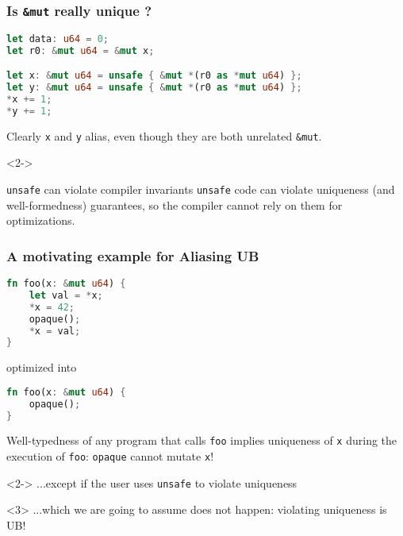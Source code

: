 \begin{frame}[fragile, t]
    \frametitle{Is \texttt{\&mut} really unique ?}
    \begin{lstlisting}[language=rust]
let data: u64 = 0;
let r0: &mut u64 = &mut x;

let x: &mut u64 = unsafe { &mut *(r0 as *mut u64) };
let y: &mut u64 = unsafe { &mut *(r0 as *mut u64) };
*x += 1;
*y += 1;
    \end{lstlisting}
    Clearly \texttt{x} and \texttt{y} alias, even though they
    are both unrelated \texttt{\&mut}.

    \begin{onlyenv}<2->
        \begin{block}{\texttt{unsafe} can violate compiler invariants}
            \texttt{unsafe} code can violate uniqueness (and well-formedness)
            guarantees, so the compiler cannot rely on them for optimizations.
        \end{block}
    \end{onlyenv}
\end{frame}

\begin{frame}[fragile, t]
    \frametitle{A motivating example for Aliasing UB}
    \begin{lstlisting}[language=rust]
fn foo(x: &mut u64) {
    let val = *x;
    *x = 42;
    opaque();
    *x = val;
}
    \end{lstlisting}
    optimized into
    \begin{lstlisting}[language=rust]
fn foo(x: &mut u64) {
    opaque();
}
    \end{lstlisting}
    Well-typedness of any program that calls \texttt{foo} implies uniqueness
    of \texttt{x} during the execution of \texttt{foo}: \texttt{opaque} cannot mutate \texttt{x}!\\
    \begin{onlyenv}<2->
    ...except if the user uses \texttt{unsafe} to violate uniqueness \\
    \end{onlyenv}
    \begin{onlyenv}<3>
    ...which we are going to assume does not happen: violating uniqueness is UB!
    \end{onlyenv}
\end{frame}

